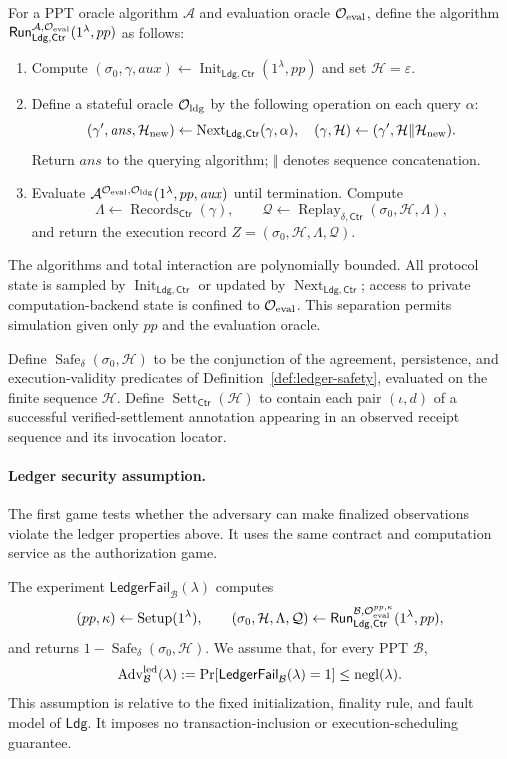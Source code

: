 \documentclass[10pt,letterpaper]{article}
\newcommand{\negl}{\operatorname{negl}}
\newcommand{\Ldg}{\mathsf{Ldg}}
\newcommand{\Ctr}{\mathsf{Ctr}}
\newcommand{\EvalO}{\mathcal O_{\rm eval}}
\newcommand{\LdgO}{\mathcal O_{\rm ldg}}
\begin{document}
For a PPT oracle algorithm $\mathcal A$ and evaluation oracle $\EvalO$, define the algorithm $\mathsf{Run}_{\Ldg,\Ctr}^{\mathcal A,\EvalO}(1^\lambda,pp)$ as follows:
\begin{enumerate}[label=\arabic*.]
 \item Compute $(\sigma_0,\gamma,\mathit{aux})\leftarrow\operatorname{Init}_{\Ldg,\Ctr}(1^\lambda,pp)$ and set $\mathcal H=\varepsilon$.
 \item Define a stateful oracle $\LdgO$ by the following operation on each query $\alpha$:
 \[
 (\gamma',\mathit{ans},\mathcal H_{\rm new})\leftarrow\operatorname{Next}_{\Ldg,\Ctr}(\gamma,\alpha),
 \quad
 (\gamma,\mathcal H)\gets(\gamma',\mathcal H\Vert\mathcal H_{\rm new}).
 \]
 Return $\mathit{ans}$ to the querying algorithm; $\Vert$ denotes sequence concatenation.
 \item Evaluate $\mathcal A^{\EvalO,\LdgO}(1^\lambda,pp,\mathit{aux})$ until termination. Compute
 \[
 \Lambda\gets\operatorname{Records}_{\Ctr}(\gamma),\qquad
 \mathcal Q\gets\operatorname{Replay}_{\delta,\Ctr}(\sigma_0,\mathcal H,\Lambda),
 \]
 and return the execution record $Z=(\sigma_0,\mathcal H,\Lambda,\mathcal Q)$.
\end{enumerate}
The algorithms and total interaction are polynomially bounded. All protocol state is sampled by $\operatorname{Init}_{\Ldg,\Ctr}$ or updated by $\operatorname{Next}_{\Ldg,\Ctr}$; access to private computation-backend state is confined to $\EvalO$. This separation permits simulation given only $pp$ and the evaluation oracle.

Define $\operatorname{Safe}_\delta(\sigma_0,\mathcal H)$ to be the conjunction of the agreement, persistence, and execution-validity predicates of Definition~\ref{def:ledger-safety}, evaluated on the finite sequence $\mathcal H$. Define $\operatorname{Sett}_{\Ctr}(\mathcal H)$ to contain each pair $(\iota,d)$ of a successful verified-settlement annotation appearing in an observed receipt sequence and its invocation locator.

\paragraph{Ledger security assumption.}
The first game tests whether the adversary can make finalized observations violate the ledger properties above. It uses the same contract and computation service as the authorization game.

The experiment $\mathsf{LedgerFail}_{\mathcal B}(\lambda)$ computes
\[
 (pp,\kappa)\leftarrow\operatorname{Setup}(1^\lambda),\qquad
 (\sigma_0,\mathcal H,\Lambda,\mathcal Q)
   \leftarrow\mathsf{Run}_{\Ldg,\Ctr}^{\mathcal B,\EvalO^{pp,\kappa}}(1^\lambda,pp),
\]
and returns $1-\operatorname{Safe}_\delta(\sigma_0,\mathcal H)$. We assume that, for every PPT $\mathcal B$,
\[
 \operatorname{Adv}^{\rm led}_{\mathcal B}(\lambda)
 :=\Pr[\mathsf{LedgerFail}_{\mathcal B}(\lambda)=1]\leq\negl(\lambda).
\]
This assumption is relative to the fixed initialization, finality rule, and fault model of $\Ldg$. It imposes no transaction-inclusion or execution-scheduling guarantee.
\end{document}
